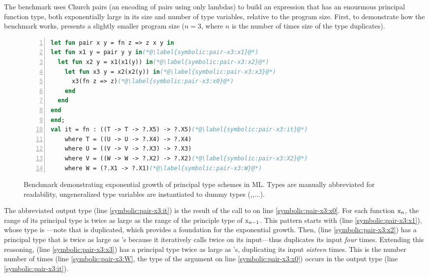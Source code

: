 The benchmark uses Church pairs (an encoding of pairs using only lambdas)
to build an expression that has an enourmous principal function type,
both exponentially large in its size and number of type variables, relative
to the program size.
First, to demonstrate how the benchmark works, 
presents a slightly smaller program size
($n=3$, where $n$ is the number of times size of the type duplicates).


\begin{figure}
\begin{lstlisting}[language=ml, numbers=left]
let fun pair x y = fn z => z x y in
let fun x1 y = pair y y in(*@\label{symbolic:pair-x3:x1}@*)
  let fun x2 y = x1(x1(y)) in(*@\label{symbolic:pair-x3:x2}@*)
    let fun x3 y = x2(x2(y)) in(*@\label{symbolic:pair-x3:x3}@*)
      x3(fn z => z)(*@\label{symbolic:pair-x3:x0}@*)
    end
  end
end
end;
val it = fn : ((T -> T -> ?.X5) -> ?.X5)(*@\label{symbolic:pair-x3:it}@*)
    where T = ((U -> U -> ?.X4) -> ?.X4)
    where U = ((V -> V -> ?.X3) -> ?.X3)
    where V = ((W -> W -> ?.X2) -> ?.X2)(*@\label{symbolic:pair-x3:X2}@*)
    where W = (?.X1 -> ?.X1)(*@\label{symbolic:pair-x3:W}@*)
\end{lstlisting}
\caption{Benchmark demonstrating exponential growth of principal type schemes in ML.
  Types are manually abbreviated for readability, ungeneralized type variables are
  instantiated to dummy types (,,...).}
\label{symbolic:figure:pair-benchmark}
\end{figure}

The abbreviated output type  (line \ref{symbolic:pair-x3:it}) is the result of the call to 
on line \ref{symbolic:pair-x3:x0}.
For each function $\text{\sml{x}}_n$, the range of its principal type is twice as large as
the range of the principle type of $\text{\sml{x}}_{n-1}$.
This pattern starts with  (line \ref{symbolic:pair-x3:x1}),
whose type is ---note that 
is duplicated, which provides a foundation for the exponential growth.
Then,  (line \ref{symbolic:pair-x3:x2})
has a principal type that is twice as large as 's because it
iteratively calls  twice on its input---thus  duplicates its input \emph{four} times.
Extending this reasoning,  (line \ref{symbolic:pair-x3:x3})
has a principal type twice as large as 's,
duplicating its input \emph{sixteen} times.
This is the number number of times  (line \ref{symbolic:pair-x3:W},
the type of the argument  on line \ref{symbolic:pair-x3:x0})
occurs in the output type (line \ref{symbolic:pair-x3:it}).

